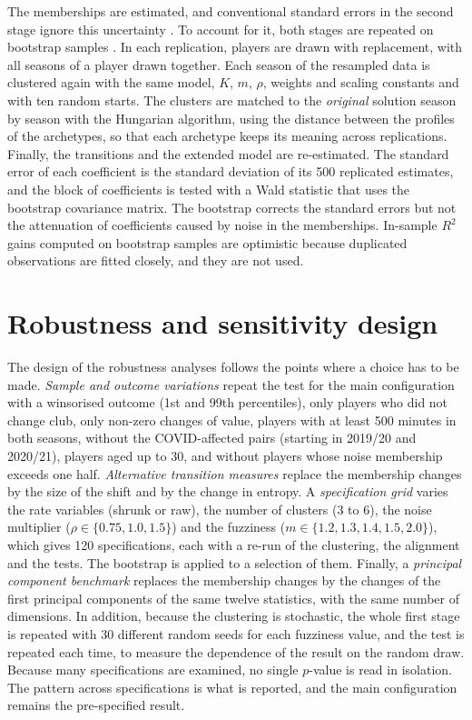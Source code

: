 The memberships are estimated, and conventional standard errors in the second stage ignore this uncertainty \cite{pagan1984econometric}. To account for it, both stages are repeated on bootstrap samples \cite{efron1979bootstrap}. In each replication, players are drawn with replacement, with all seasons of a player drawn together. Each season of the resampled data is clustered again with the same model, $K$, $m$, $\rho$, weights and scaling constants and with ten random starts. The clusters are matched to the \emph{original} solution season by season with the Hungarian algorithm, using the distance between the profiles of the archetypes, so that each archetype keeps its meaning across replications. Finally, the transitions and the extended model are re-estimated. The standard error of each coefficient is the standard deviation of its 500 replicated estimates, and the block of coefficients is tested with a Wald statistic that uses the bootstrap covariance matrix. The bootstrap corrects the standard errors but not the attenuation of coefficients caused by noise in the memberships. In-sample $R^2$ gains computed on bootstrap samples are optimistic because duplicated observations are fitted closely, and they are not used.

\section{Robustness and sensitivity design}
\label{sec:method-robustness}

The design of the robustness analyses follows the points where a choice has to be made. \emph{Sample and outcome variations} repeat the test for the main configuration with a winsorised outcome (1st and 99th percentiles), only players who did not change club, only non-zero changes of value, players with at least 500 minutes in both seasons, without the COVID-affected pairs (starting in 2019/20 and 2020/21), players aged up to 30, and without players whose noise membership exceeds one half. \emph{Alternative transition measures} replace the membership changes by the size of the shift and by the change in entropy. A \emph{specification grid} varies the rate variables (shrunk or raw), the number of clusters (3 to 6), the noise multiplier ($\rho\in\{0.75,1.0,1.5\}$) and the fuzziness ($m\in\{1.2,1.3,1.4,1.5,2.0\}$), which gives 120 specifications, each with a re-run of the clustering, the alignment and the tests. The bootstrap is applied to a selection of them. Finally, a \emph{principal component benchmark} replaces the membership changes by the changes of the first principal components of the same twelve statistics, with the same number of dimensions. In addition, because the clustering is stochastic, the whole first stage is repeated with 30 different random seeds for each fuzziness value, and the test is repeated each time, to measure the dependence of the result on the random draw. Because many specifications are examined, no single $p$-value is read in isolation. The pattern across specifications is what is reported, and the main configuration remains the pre-specified result.

